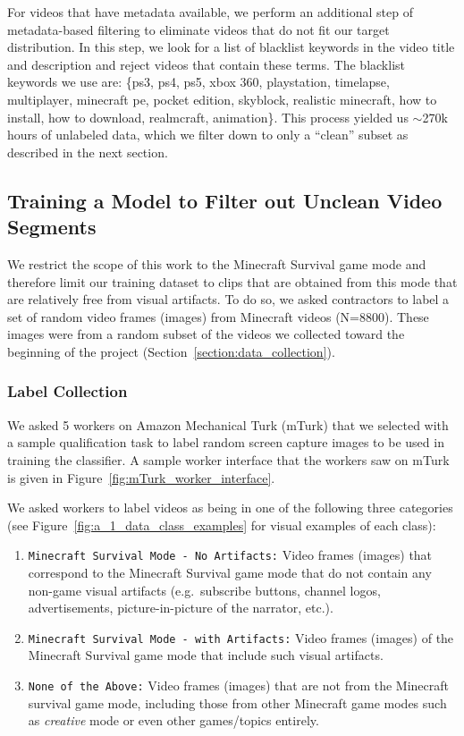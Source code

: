For videos that have metadata available, we perform an additional step of metadata-based filtering to eliminate videos that do not fit our target distribution. In this step, we look for a list of blacklist keywords in the video title and description and reject videos that contain these terms. The blacklist keywords we use are: \{ps3, ps4, ps5, xbox 360, playstation, timelapse, multiplayer, minecraft pe, pocket edition, skyblock, realistic minecraft, how to install, how to download, realmcraft, animation\}. This process yielded us $\sim$270k hours of unlabeled data, which we filter down to only a ``clean'' subset as described in the next section.



\subsection{Training a Model to Filter out Unclean Video Segments}\label{section:svm}

We restrict the scope of this work to the Minecraft Survival game mode and therefore limit our training dataset to clips that are obtained from this mode that are relatively free from visual artifacts. To do so, we asked contractors to label a set of random video frames (images) from Minecraft videos (N=8800). These images were from  a random subset of the videos we collected toward the beginning of the project (Section~\ref{section:data_collection}).


\subsubsection{Label Collection}


We asked 5 workers on Amazon Mechanical Turk (mTurk) that we selected with a sample qualification task to label random screen capture images to be used in training the classifier. A sample worker interface that the workers saw on mTurk is given in Figure~\ref{fig:mTurk_worker_interface}.

We asked workers to label videos as being in one of the following three categories (see Figure~\ref{fig:a_1_data_class_examples} for visual examples of each class):
\begin{enumerate}
    \item \texttt{Minecraft Survival Mode - No Artifacts:} Video frames (images) that correspond to the Minecraft Survival game mode that do not contain any non-game visual artifacts (e.g.\ subscribe buttons, channel logos, advertisements, picture-in-picture of the narrator, etc.).
    \item \texttt{Minecraft Survival Mode - with Artifacts:} Video frames (images) of the Minecraft Survival game mode that include such visual artifacts. 
    \item \texttt{None of the Above:} Video frames (images) that are not from the Minecraft survival game mode, including those from other Minecraft game modes such as \emph{creative} mode or even other games/topics entirely.
\end{enumerate}

